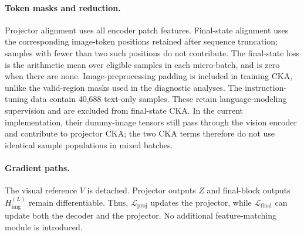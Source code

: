 \paragraph{Token masks and reduction.}
Projector alignment uses all encoder patch features. Final-state alignment uses
the corresponding image-token positions retained after sequence truncation;
samples with fewer than two such positions do not contribute. The final-state
loss is the arithmetic mean over eligible samples in each micro-batch, and is
zero when there are none. Image-preprocessing padding is included in training
CKA, unlike the valid-region masks used in the diagnostic analyses.
The instruction-tuning data contain 40,688 text-only samples. These retain
language-modeling supervision and are excluded from final-state CKA. In the
current implementation, their dummy-image tensors still pass through the vision
encoder and contribute to projector CKA; the two CKA terms therefore do not use
identical sample populations in mixed batches.

\paragraph{Gradient paths.}
The visual reference $V$ is detached. Projector outputs $Z$ and final-block
outputs $H_{\mathrm{img}}^{(L)}$ remain differentiable. Thus,
$\mathcal L_{\mathrm{proj}}$ updates the projector, while
$\mathcal L_{\mathrm{final}}$ can update both the decoder and the projector.
No additional feature-matching module is introduced.
